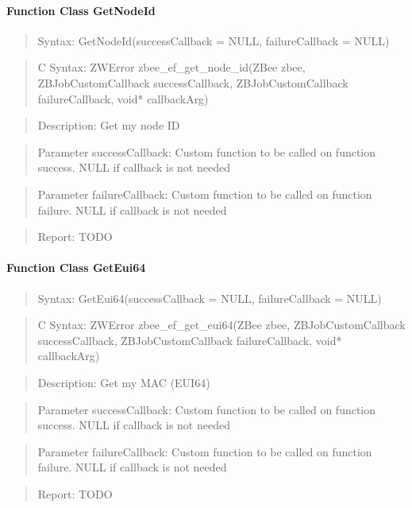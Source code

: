 \paragraph{Function Class GetNodeId}
\begin{quote}Syntax: GetNodeId(successCallback = NULL, failureCallback = NULL)\end{quote}
\begin{quote}C Syntax: ZWError zbee\_ef\_get\_node\_id(ZBee zbee, ZBJobCustomCallback successCallback, ZBJobCustomCallback failureCallback, void* callbackArg)\end{quote}
\begin{quote}Description: Get my node ID\end{quote}
\begin{quote}Parameter successCallback: Custom function to be called on function success. NULL if callback is not needed\end{quote}
\begin{quote}Parameter failureCallback: Custom function to be called on function failure. NULL if callback is not needed\end{quote}
\begin{quote}Report: TODO\end{quote}

\paragraph{Function Class GetEui64}
\begin{quote}Syntax: GetEui64(successCallback = NULL, failureCallback = NULL)\end{quote}
\begin{quote}C Syntax: ZWError zbee\_ef\_get\_eui64(ZBee zbee, ZBJobCustomCallback successCallback, ZBJobCustomCallback failureCallback, void* callbackArg)\end{quote}
\begin{quote}Description: Get my MAC (EUI64)\end{quote}
\begin{quote}Parameter successCallback: Custom function to be called on function success. NULL if callback is not needed\end{quote}
\begin{quote}Parameter failureCallback: Custom function to be called on function failure. NULL if callback is not needed\end{quote}
\begin{quote}Report: TODO\end{quote}

